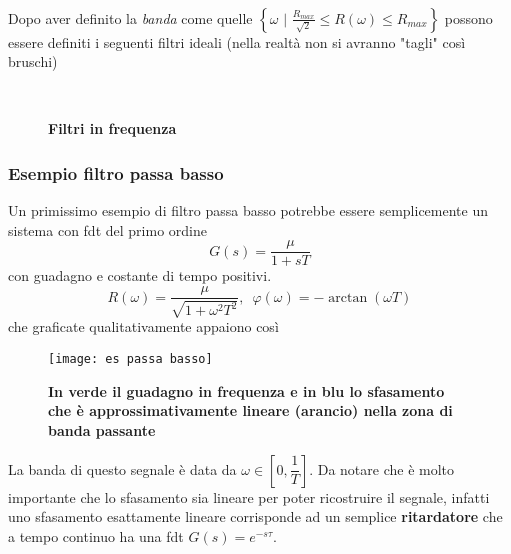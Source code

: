 \documentclass[a4paper]{article}
\begin{document}
	\\Dopo aver definito la \emph{banda} come quelle $\left\lbrace \omega \,\,|\,\,\frac{R_{max}}{\sqrt{2}}\le R(\omega) \le R_{max}\right\rbrace$
	possono essere definiti i seguenti filtri \color{green}ideali \color{black} (nella realtà non si avranno "tagli" così bruschi)
	\begin{figure}[H]
		\centering
		\qquad %
		\\
		\qquad %
		\caption{\textbf{Filtri in frequenza}}
	\end{figure}
	\subsubsection*{Esempio filtro passa basso}
	Un primissimo esempio di filtro passa basso potrebbe essere semplicemente un sistema con fdt del primo ordine \[G(s)=\dfrac{\mu}{1+sT}\] con guadagno e costante di tempo positivi.
	\[R(\omega)=\dfrac{\mu}{\sqrt{1+\omega^2T^2}},\,\,\,\varphi(\omega)=-\arctan(\omega T)\] che graficate qualitativamente appaiono così 
	\begin{figure}[H]
		\centering
		\texttt{[image: es passa basso]}
		\caption{\textbf{In verde il guadagno in frequenza e in blu lo sfasamento che è approssimativamente lineare (arancio) nella zona di banda passante}}
	\end{figure}
	La banda di questo segnale è data da $\omega\in\left[0,\dfrac{1}{T} \right] $. Da notare che è molto importante che lo sfasamento sia lineare per poter ricostruire il segnale, infatti uno sfasamento esattamente lineare corrisponde ad un semplice \textbf{ritardatore} che a tempo continuo ha una fdt $G(s)=e^{-s\tau}$.
\end{document}
